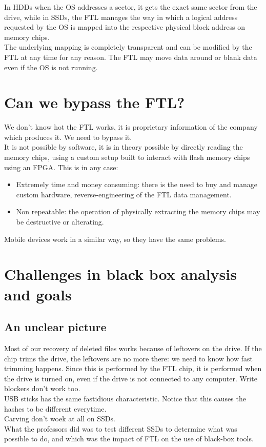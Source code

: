 In HDDs when the OS addresses a sector, it gets the exact same sector from the drive, while in SSDs, the FTL manages the way in which a logical address requested by the OS is mapped into the respective physical block address on memory chips.\\
The underlying mapping is completely transparent and can be modified by the FTL at any time for any reason. The FTL may move data around or blank data even if the OS is not running.
\section{Can we bypass the FTL?}
    We don't know hot the FTL works, it is proprietary information of the company which produces it. We need to bypass it.\\
    It is not possible by software, it is in theory possible by directly reading the memory chips, using a custom setup built to interact with flash memory chips using an FPGA. This is in any case:
    \begin{itemize}
        \item Extremely time and money consuming: there is the need to buy and manage custom hardware, reverse-engineering of the FTL data management.
        \item Non repeatable: the operation of physically extracting the memory chips may be destructive or alterating.
    \end{itemize}
    Mobile devices work in a similar way, so they have the same problems.
\section{Challenges in black box analysis and goals}
    \subsection{An unclear picture}
        Most of our recovery of deleted files works because of leftovers on the drive. If the chip trims the drive, the leftovers are no more there: we need to know how fast trimming happens. Since this is performed by the FTL chip, it is performed when the drive is turned on, even if the drive is not connected to any computer. Write blockers don't work too.\\
        USB sticks has the same fastidious characteristic. Notice that this causes the hashes to be different everytime.\\
        Carving don't woek at all on SSDs.\\
        What the professors did was to test different SSDs to determine what was possible to do, and which was the impact of FTL on the use of black-box tools.

